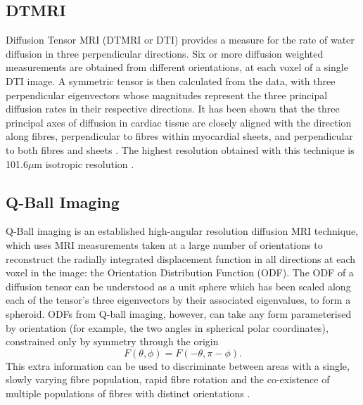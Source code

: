   \subsection{DTMRI} %
  \label{sub:dtmri}
    Diffusion Tensor MRI (DTMRI or DTI) provides a measure for the rate of water diffusion in three perpendicular directions. Six or more diffusion weighted measurements are obtained from different orientations, at each voxel of a single DTI image. A symmetric tensor is then calculated from the data, with three perpendicular eigenvectors whose magnitudes represent the three principal diffusion rates in their respective directions. It has been shown that the three principal axes of diffusion in cardiac tissue are closely aligned with the direction along fibres, perpendicular to fibres within myocardial sheets, and perpendicular to both fibres and sheets \cite{Scollan:1998p942}. The highest resolution obtained with this technique is 101.6$\mu$m isotropic resolution \cite{Bishop:2009p940}.
  
  
  \subsection{Q-Ball Imaging} %
  \label{sub:q_ball_imaging}
    Q-Ball imaging is an established high-angular resolution diffusion MRI technique, which uses MRI measurements taken at a large number of orientations to reconstruct the radially integrated displacement function in all directions at each voxel in the image: the Orientation Distribution Function (ODF). The ODF of a diffusion tensor can be understood as a unit sphere which has been scaled along each of the tensor's three eigenvectors by their associated eigenvalues, to form a spheroid. ODFs from Q-ball imaging, however, can take any form parameterised by orientation (for example, the two angles in spherical polar coordinates), constrained only by symmetry through the origin
    \begin{equation}
      F(\theta, \phi) = F(-\theta, \pi - \phi).
    \end{equation}
    This extra information can be used to discriminate between areas with a single, slowly varying fibre population, rapid fibre rotation and the co-existence of multiple populations of fibres with distinct orientations \cite{Dierckx:2009p663}.
  
  
